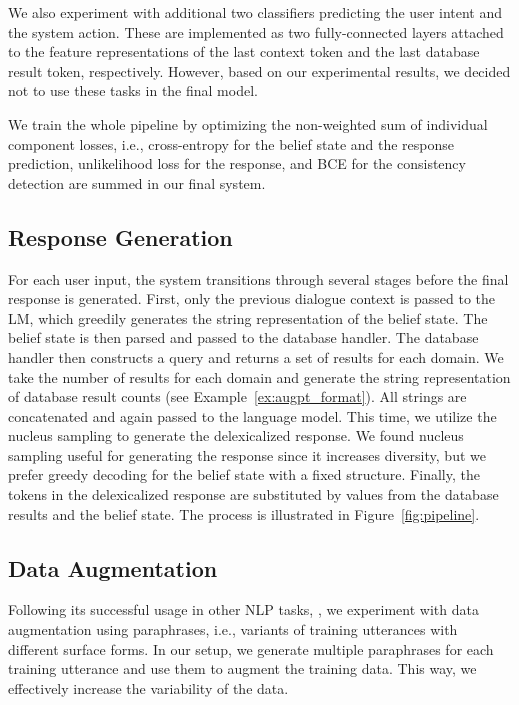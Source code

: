 \documentclass[11pt,a4paper]{article}
\newcommand{\exampleref}[1]{Example~\ref{#1}}
\begin{document}
We also experiment with additional two classifiers predicting the user intent and the system action. These are implemented as two fully-connected layers attached to the feature representations of the last context token and the last database result token, respectively. 
However, based on our experimental results, we decided not to use these tasks in the final model.

We train the whole pipeline by optimizing the non-weighted sum of individual component losses, i.e., cross-entropy for the belief state and the response prediction, unlikelihood loss for the response, and BCE for the consistency detection are summed in our final system.

\subsection{Response Generation}
For each user input, the system transitions through several stages before the final response is generated. First, only the previous dialogue context is passed to the LM, which greedily generates the string representation of the belief state. The belief state is then parsed and passed to the database handler. The database handler then constructs a query and returns a set of results for each domain. We take the number of results for each domain and generate the string representation of database result counts (see \exampleref{ex:augpt_format}). All strings are concatenated and again passed to the language model. This time, we utilize the nucleus sampling \cite{holtzman2019} to generate the delexicalized response. We found nucleus sampling useful for generating the response since it increases diversity, but we prefer greedy decoding for the belief state with a fixed structure. Finally, the tokens in the delexicalized response are substituted by values from the database results and the belief state. The process is illustrated in Figure~\ref{fig:pipeline}.

\subsection{Data Augmentation}
Following its successful usage in other NLP tasks, \cite{konstas_neural_2017,elder_shape_2020}, we experiment with data augmentation using paraphrases, i.e., variants of training utterances with different surface forms.
In our setup, we generate multiple paraphrases for each training utterance and use them to augment the training data.
This way, we effectively increase the variability of the data.
\end{document}

